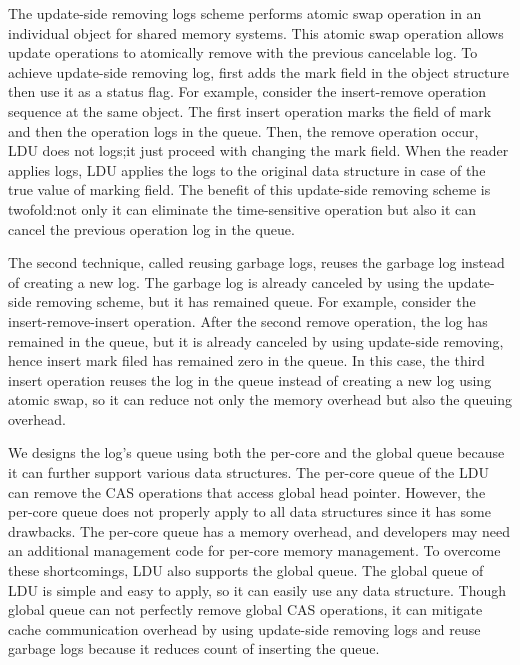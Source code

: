 The update-side removing logs scheme performs atomic swap operation in an
individual object for shared memory systems.
This atomic swap operation allows update operations to atomically remove with the
previous cancelable log.
To achieve update-side removing log, first adds the mark field in the object
structure then use it as a status flag. 
For example, consider the insert-remove operation sequence at the same object.
The first insert operation marks the field of mark and then the operation logs
in the queue.
Then, the remove operation occur, LDU does not logs;it just proceed with
changing the mark field.
When the reader applies logs, LDU applies the logs to the original data
structure in case of the true value of marking field.
The benefit of this update-side removing scheme is twofold:not only it can
eliminate the time-sensitive operation but also it can cancel the previous
operation log in the queue.


The second technique, called reusing garbage logs, reuses the garbage log
instead of creating a new log.
The garbage log is already canceled by using the update-side removing scheme,
but it has remained queue.
For example, consider the insert-remove-insert operation.
After the second remove operation, the log has remained in the queue, but it is 
already canceled by using update-side removing, hence insert mark filed
has remained zero in the queue.
In this case, the third insert operation reuses the log in the queue instead of 
creating a new log using atomic swap, so it can reduce not only the memory
overhead but also the queuing overhead.

We designs the log's queue using both the per-core and the global queue because
it can further support various data structures.
The per-core queue of the LDU can remove the CAS operations that access global
head pointer. 
However, the per-core queue does not properly apply to all data structures since
it has some drawbacks.
The per-core queue has a memory overhead, and developers may need
an additional management code for per-core memory management.
To overcome these shortcomings, LDU also supports the global queue.
The global queue of LDU is simple and easy to apply, so it can easily use any
data structure.
Though global queue can not perfectly remove global CAS operations, it can
mitigate cache communication overhead by using update-side removing
logs and reuse garbage logs because it reduces count of inserting the
queue.

